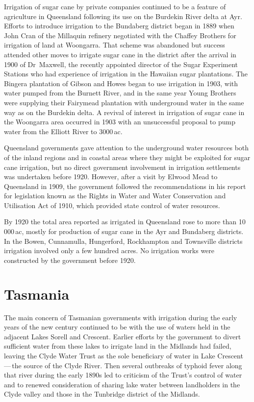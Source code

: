 Irrigation of sugar cane by private companies continued to be a
feature of agriculture in Queensland following its use on the Burdekin
River delta at Ayr.  Efforts to introduce irrigation to the Bundaberg
district began in 1889 when John Cran of the Millaquin refinery
negotiated with the Chaffey Brothers for irrigation of land at
Woongarra. That scheme was abandoned but success attended other moves
to irrigate sugar cane in the district after the arrival in 1900 of
Dr~Maxwell, the recently appointed director of the Sugar Experiment
Stations who had experience of irrigation in the Hawaiian sugar
plantations.  The Bingera plantation of Gibson and Howes began to use
irrigation in 1903, with water pumped from the Burnett River, and in
the same year Young Brothers were supplying their Fairymead plantation
with underground water in the same way as on the Burdekin delta.  A
revival of interest in irrigation of sugar cane in the Woongarra area
occurred in 1903 with an unsuccessful proposal to pump water from the
Elliott River to 3000\,ac.

Queensland governments gave attention to the underground water
resour\-ces both of the inland regions and in coastal areas where they
might be exploited for sugar cane irrigation, but no direct government
involvement in irrigation settlements was undertaken before 1920.
However, after a visit by Elwood Mead to Queensland in 1909, the
government followed the recommendations in his report for legislation
known as the Rights in Water and Water Conservation and Utilisation
Act of 1910, which provided state control of water resources.

By 1920 the total area reported as irrigated in Queensland rose to
more than 10\,000\,ac, mostly for production of sugar cane in the Ayr
and Bundaberg districts.  In the Bowen, Cunnamulla, Hungerford,
Rockhampton and Townsville districts irrigation involved only a few
hundred acres.  No irrigation works were constructed by the government
before 1920.

\section*{Tasmania}

The main concern of Tasmanian governments with irrigation during the
early years of the new century continued to be with the use of waters
held in the adjacent Lakes Sorell and Crescent.  Earlier efforts by
the government to divert sufficient water from these lakes to irrigate
land in the Midlands had failed, leaving the Clyde Water Trust as the
sole beneficiary of water in Lake Crescent\,---\,the source of the Clyde
River.  Then several outbreaks of typhoid fever along that river
during the early 1890s led to criticism of the Trust's control of
water and to renewed consideration of sharing lake water between
landholders in the Clyde valley and those in the Tunbridge district of
the Midlands.

